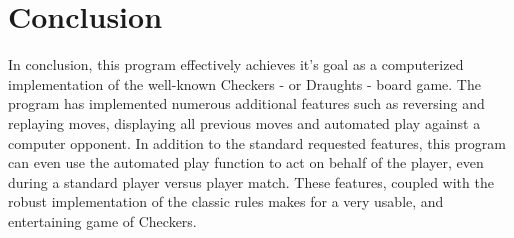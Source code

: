 \documentclass[10pt, a4paper]{article}
\begin{document}
    \section{Conclusion}
    In conclusion, this program effectively achieves it's goal as a computerized implementation of the well-known Checkers - or Draughts - board game. The program has implemented numerous additional features such as reversing and replaying moves, displaying all previous moves and automated play against a computer opponent. In addition to the standard requested features, this program can even use the automated play function to act on behalf of the player, even during a standard player versus player match. These features, coupled with the robust implementation of the classic rules makes for a very usable, and entertaining game of Checkers.
    


		
\end{document}
